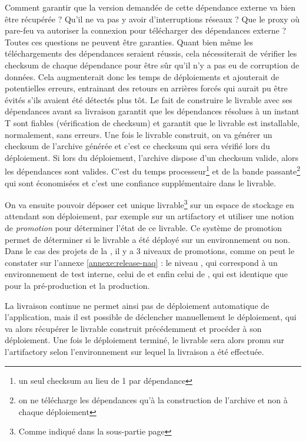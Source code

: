 Comment garantir que la version demandée de cette dépendance externe va bien être récupérée ? Qu'il ne va pas y avoir d'interruptions réseaux ? Que le proxy où pare-feu va autoriser la connexion pour télécharger des dépendances externe ? Toutes ces questions ne peuvent être garanties. Quant bien même les téléchargements des dépendances seraient réussis, cela nécessiterait de vérifier les \gls{checksum} de chaque dépendance pour être sûr qu'il n'y a pas eu de corruption de données. Cela augmenterait donc les temps de déploiements et ajouterait de potentielles erreurs, entrainant des retours en arrières forcés qui aurait pu être évités s'ils avaient été détectés plus tôt. Le fait de construire le livrable avec ses dépendances avant sa livraison garantit que les dépendances résolues à un instant T sont fiables (vérification de \gls{checksum}) et garantit que le livrable est installable, normalement, sans erreurs. Une fois le livrable construit, on va générer un \gls{checksum} de l'archive générée et c'est ce \gls{checksum} qui sera vérifié lors du déploiement. Si lors du déploiement, l'archive dispose d'un \gls{checksum} valide, alors les dépendances sont valides. C'est du temps processeur\footnote{un seul \gls{checksum} au lieu de 1 par dépendance} et de la bande passante\footnote{on ne télécharge les dépendances qu'à la construction de l'archive et non à chaque déploiement} qui sont économisées et c'est une confiance supplémentaire dans le livrable.

On va ensuite pouvoir déposer cet unique livrable\footnote{Comme indiqué dans la sous-partie  page \pageref{gestion-de-version}} sur un espace de stockage en attendant son déploiement, par exemple sur un \gls{artifactory} et utiliser une notion de \textit{promotion} pour déterminer l'état de ce livrable. Ce système de promotion permet de déterminer si le livrable a été déployé sur un environnement ou non. Dans le cas des projets de la \naq, il y a 3 niveaux de promotions, comme on peut le constater sur l'annexe \ref{annexe:release-naq} : le niveau , qui correspond à un environnement de test interne, celui de  et enfin celui de , qui est identique que pour la pré-production et la production.

La livraison continue ne permet ainsi pas de déploiement automatique de l'application, mais il est possible de déclencher manuellement le déploiement, qui va alors récupérer le livrable construit précédemment et procéder à son déploiement. Une fois le déploiement terminé, le livrable sera alors promu sur l'\gls{artifactory} selon l'environnement sur lequel la livraison a été effectuée.

